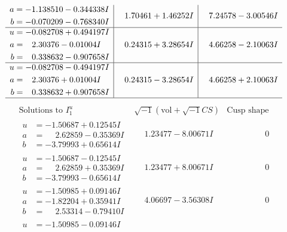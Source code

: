 \documentclass[1p]{elsarticle_modified}
\theoremstyle{definition}
\newcommand{\I}{\sqrt{-1}}
\begin{document}
$$\begin{array}{c|c|c}
\begin{aligned}
a &= -1.138510 - 0.344338 I \\
b &= -0.070209 - 0.768340 I\end{aligned}
 & \phantom{-}1.70461 + 1.46252 I & \phantom{-}7.24578 - 3.00546 I \\ \hline\begin{aligned}
u &= -0.082708 + 0.494197 I \\
a &= \phantom{-}2.30376 - 0.01004 I \\
b &= \phantom{-}0.338632 - 0.907658 I\end{aligned}
 & \phantom{-}0.24315 + 3.28654 I & \phantom{-}4.66258 - 2.10063 I \\ \hline\begin{aligned}
u &= -0.082708 - 0.494197 I \\
a &= \phantom{-}2.30376 + 0.01004 I \\
b &= \phantom{-}0.338632 + 0.907658 I\end{aligned}
 & \phantom{-}0.24315 - 3.28654 I & \phantom{-}4.66258 + 2.10063 I\\
 \hline 
 \end{array}$$\newpage$$\begin{array}{c|c|c}  
\text{Solutions to }I^u_{1}& \I (\text{vol} + \sqrt{-1}CS) & \text{Cusp shape}\\
 \hline 
\begin{aligned}
u &= -1.50687 + 0.12545 I \\
a &= \phantom{-}2.62859 - 0.35369 I \\
b &= -3.79993 + 0.65614 I\end{aligned}
 & \phantom{-}1.23477 - 8.00671 I & \phantom{-0.000000 } 0 \\ \hline\begin{aligned}
u &= -1.50687 - 0.12545 I \\
a &= \phantom{-}2.62859 + 0.35369 I \\
b &= -3.79993 - 0.65614 I\end{aligned}
 & \phantom{-}1.23477 + 8.00671 I & \phantom{-0.000000 } 0 \\ \hline\begin{aligned}
u &= -1.50985 + 0.09146 I \\
a &= -1.82204 + 0.35941 I \\
b &= \phantom{-}2.53314 - 0.79410 I\end{aligned}
 & \phantom{-}4.06697 - 3.56308 I & \phantom{-0.000000 } 0 \\ \hline\begin{aligned}
u &= -1.50985 - 0.09146 I \\

\end{aligned}
\end{array}$$
\end{document}
